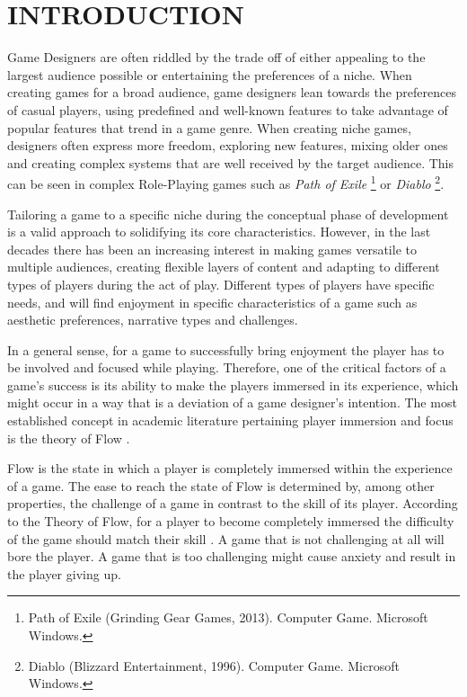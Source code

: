 \chapter{INTRODUCTION}

Game Designers are often riddled by the trade off of either appealing to the largest audience possible or entertaining the preferences of a niche. When creating games for a broad audience, game designers lean towards the preferences of casual players, using predefined and well-known features to take advantage of popular features that trend in a game genre. When creating niche games, designers often express more freedom, exploring new features, mixing older ones and creating complex systems that are well received by the target audience. This can be seen in complex Role-Playing games such as \emph{Path of Exile} \footnote{Path of Exile (Grinding Gear Games, 2013). Computer Game. Microsoft Windows.} or \emph{Diablo} \footnote{Diablo (Blizzard Entertainment, 1996). Computer Game. Microsoft Windows.}.

Tailoring a game to a specific niche during the conceptual phase of development is a valid approach to solidifying its core characteristics. However, in the last decades there has been an increasing interest in making games versatile to multiple audiences, creating flexible layers of content and adapting to different types of players during the act of play. Different types of players have specific needs, and will find enjoyment in specific characteristics of a game such as aesthetic preferences, narrative types and challenges.

In a general sense, for a game to successfully bring enjoyment the player has to be involved and focused while playing. Therefore, one of the critical factors of a game's success is its ability to make the players immersed in its experience, which might occur in a way that is a deviation of a game designer's intention. The most established concept in academic literature pertaining player immersion and focus is the theory of Flow \cite{BOOK_Flow}. 

Flow is the state in which a player is completely immersed within the experience of a game. The ease to reach the state of Flow is determined by, among other properties, the challenge of a game in contrast to the skill of its player. According to the Theory of Flow, for a player to become completely immersed the difficulty of the game should match their skill \cite{ARTICLE_FlowInGames}. A game that is not challenging at all will bore the player. A game that is too challenging might cause anxiety and result in the player giving up. 

